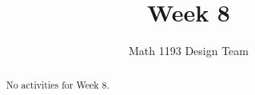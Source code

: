 \documentclass[noauthor]{ximera}
\title{Week 8}
\author{Math 1193 Design Team}
\begin{document}
\begin{abstract}
    No activities for Week 8.
\end{abstract}
\maketitle







\end{document}
